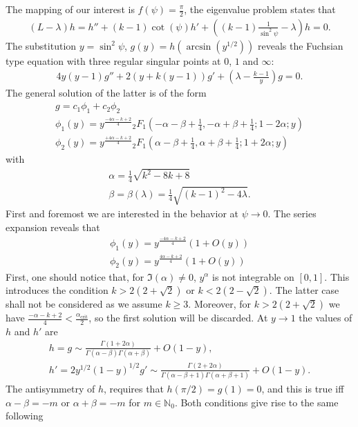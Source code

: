 \documentclass[
a4paper,%
10pt,%
titlepage,%
twoside%
]{article}
\begin{document}
The mapping of our interest is $f(\psi)=\frac{\pi}{2}$, the eigenvalue
problem states that
\begin{gather}\label{eq:problem}
  (L-\lambda)h=h''+(k-1)\cot(\psi)h'+((k-1)\frac{1}{\sin^2\psi}-\lambda)h=0.
\end{gather}
The substitution $y=\sin^2\psi$, $g(y)=h(\arcsin(y^{1/2}))$ reveals
the Fuchsian type equation with three regular singular points at $0$,
$1$ and $\infty$:
\begin{gather}
  4y(y-1)g''+2(y+k(y-1))g'+(\lambda-\frac{k-1}{y})g=0.
\end{gather}
The general solution of the latter is of the form
\begin{gather}
  g=c_1\phi_1+c_2\phi_2\\
  \phi_1(y)=y^{\frac{-4\alpha-k+2}{4}}{}_2F_1 (-\alpha-\beta+\frac{1}{4},-\alpha+\beta+\frac{1}{4};1-2\alpha;y)\\
  \phi_2(y)=y^{\frac{+4\alpha-k+2}{4}}{}_2F_1 (\alpha-\beta+\frac{1}{4},\alpha+\beta+\frac{1}{4};1+2\alpha;y)\label{eq:sol}
\end{gather}
with
\begin{gather}
  \alpha=\frac{1}{4}\sqrt{k^2-8 k+8}\\
  \beta=\beta(\lambda)=\frac{1}{4}\sqrt{(k-1)^2-4\lambda}.
\end{gather}
First and foremost we are interested in the behavior at
$\psi\rightarrow0$. The series expansion reveals that
\begin{gather}
  \phi_1(y)=y^{\frac{-4\alpha-k+2}{4}}(1+O(y))\\
  \phi_2(y)=y^{\frac{4\alpha-k+2}{4}}(1+O(y))
\end{gather}
First, one should notice that, for $\Im(\alpha)\ne0$, $y^\alpha$ is
not integrable on $[0,1]$. This introduces the condition
$k>2(2+\sqrt{2})$ or $k<2(2-\sqrt{2})$. The latter case shall not be
considered as we assume $k\ge3$. Moreover, for $k>2(2+\sqrt{2})$ we
have $\frac{-\alpha-k+2}{4}<\frac{\alpha_{\text{crit}}}{2}$, so the
first solution will be discarded. At $y\rightarrow1$ the values of $h$
and $h'$ are
\begin{gather}
  h=g\sim\frac{\Gamma(1+2\alpha)}{\Gamma(\alpha-\beta)\Gamma(\alpha+\beta)}+O(1-y),\\
  h'=2y^{1/2}(1-y)^{1/2}g'\sim\frac{\Gamma(2+2\alpha)}{\Gamma(\alpha-\beta+1)\Gamma(\alpha+\beta+1)}+O(1-y).
\end{gather}
The antisymmetry of $h$, requires that $h(\pi/2)=g(1)=0$, and this is true
iff $\alpha-\beta=-m$ or $\alpha+\beta=-m$ for
$m\in\mathbb{N}_0$. Both conditions give rise to the same following
\end{document}
